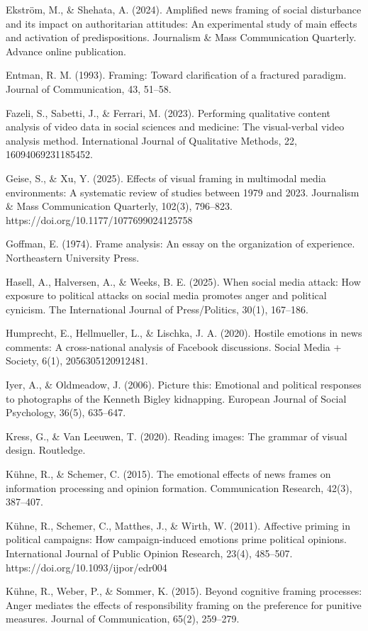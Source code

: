 \documentclass[
]{article}
\begin{document}
Ekström, M., \& Shehata, A. (2024). Amplified news framing of social
disturbance and its impact on authoritarian attitudes: An experimental
study of main effects and activation of predispositions. Journalism \&
Mass Communication Quarterly. Advance online publication.

Entman, R. M. (1993). Framing: Toward clarification of a fractured
paradigm. Journal of Communication, 43, 51--58.

Fazeli, S., Sabetti, J., \& Ferrari, M. (2023). Performing qualitative
content analysis of video data in social sciences and medicine: The
visual-verbal video analysis method. International Journal of
Qualitative Methods, 22, 16094069231185452.

Geise, S., \& Xu, Y. (2025). Effects of visual framing in multimodal
media environments: A systematic review of studies between 1979 and
2023. Journalism \& Mass Communication Quarterly, 102(3), 796--823.
https://doi.org/10.1177/1077699024125758

Goffman, E. (1974). Frame analysis: An essay on the organization of
experience. Northeastern University Press.

Hasell, A., Halversen, A., \& Weeks, B. E. (2025). When social media
attack: How exposure to political attacks on social media promotes anger
and political cynicism. The International Journal of Press/Politics,
30(1), 167--186.

Humprecht, E., Hellmueller, L., \& Lischka, J. A. (2020). Hostile
emotions in news comments: A cross-national analysis of Facebook
discussions. Social Media + Society, 6(1), 2056305120912481.

Iyer, A., \& Oldmeadow, J. (2006). Picture this: Emotional and political
responses to photographs of the Kenneth Bigley kidnapping. European
Journal of Social Psychology, 36(5), 635--647.

Kress, G., \& Van Leeuwen, T. (2020). Reading images: The grammar of
visual design. Routledge.

Kühne, R., \& Schemer, C. (2015). The emotional effects of news frames
on information processing and opinion formation. Communication Research,
42(3), 387--407.

Kühne, R., Schemer, C., Matthes, J., \& Wirth, W. (2011). Affective
priming in political campaigns: How campaign-induced emotions prime
political opinions. International Journal of Public Opinion Research,
23(4), 485--507. https://doi.org/10.1093/ijpor/edr004

Kühne, R., Weber, P., \& Sommer, K. (2015). Beyond cognitive framing
processes: Anger mediates the effects of responsibility framing on the
preference for punitive measures. Journal of Communication, 65(2),
259--279.
\end{document}
